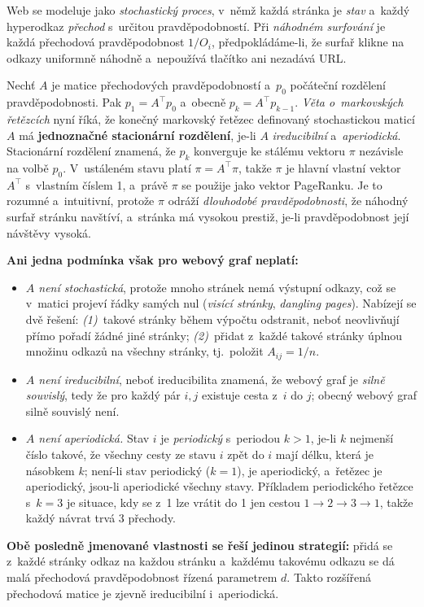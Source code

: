 \documentclass[11pt,a4paper]{article}
\theoremstyle{definition}
\begin{document}
\begin{defbox}
Web se modeluje jako \emph{stochastický proces}, v~němž každá stránka je \emph{stav} a~každý
hyperodkaz \emph{přechod} s~určitou pravděpodobností. Při \emph{náhodném surfování} je každá
přechodová pravděpodobnost $1/O_i$, předpokládáme-li, že surfař klikne na odkazy uniformně
náhodně a~nepoužívá tlačítko  ani nezadává URL.

Nechť $A$ je matice přechodových pravděpodobností a~$p_0$ počáteční rozdělení
pravděpodobnosti. Pak $p_1=A^{\!\top}p_0$ a~obecně $p_k=A^{\!\top}p_{k-1}$. \emph{Věta
o~markovských řetězcích} nyní říká, že konečný markovský řetězec definovaný stochastickou
maticí $A$ má \textbf{jednoznačné stacionární rozdělení}, je-li $A$ \emph{ireducibilní}
a~\emph{aperiodická}. Stacionární rozdělení znamená, že $p_k$ konverguje ke stálému vektoru
$\pi$ nezávisle na volbě $p_0$. V~ustáleném stavu platí $\pi=A^{\!\top}\pi$, takže $\pi$ je
hlavní vlastní vektor $A^{\!\top}$ s~vlastním číslem 1, a~právě $\pi$ se použije jako vektor
PageRanku. Je to rozumné a~intuitivní, protože $\pi$ odráží \emph{dlouhodobé pravděpodobnosti},
že náhodný surfař stránku navštíví, a~stránka má vysokou prestiž, je-li pravděpodobnost její
návštěvy vysoká.

\textbf{Ani jedna podmínka však pro webový graf neplatí:}
\begin{itemize}
\item \emph{$A$ není stochastická}, protože mnoho stránek nemá výstupní odkazy, což se
      v~matici projeví řádky samých nul (\emph{visící stránky}, \emph{dangling pages}). Nabízejí
      se dvě řešení: \emph{(1)}~takové stránky během výpočtu odstranit, neboť neovlivňují přímo
      pořadí žádné jiné stránky; \emph{(2)}~přidat z~každé takové stránky úplnou množinu odkazů
      na všechny stránky, tj.\ položit $A_{ij}=1/n$.
\item \emph{$A$ není ireducibilní}, neboť ireducibilita znamená, že webový graf je \emph{silně
      souvislý}, tedy že pro každý pár $i,j$ existuje cesta z~$i$ do $j$; obecný webový graf
      silně souvislý není.
\item \emph{$A$ není aperiodická.} Stav $i$ je \emph{periodický} s~periodou $k>1$, je-li $k$
      nejmenší číslo takové, že všechny cesty ze stavu $i$ zpět do $i$ mají délku, která je
      násobkem $k$; není-li stav periodický ($k=1$), je aperiodický, a~řetězec je aperiodický,
      jsou-li aperiodické všechny stavy. Příkladem periodického řetězce s~$k=3$ je situace, kdy
      se z~1 lze vrátit do 1 jen cestou $1\to2\to3\to1$, takže každý návrat trvá 3 přechody.
\end{itemize}
\textbf{Obě posledně jmenované vlastnosti se řeší jedinou strategií:} přidá se z~každé stránky
odkaz na každou stránku a~každému takovému odkazu se dá malá přechodová pravděpodobnost řízená
parametrem $d$. Takto rozšířená přechodová matice je zjevně ireducibilní i~aperiodická.
\end{defbox}
\end{document}
